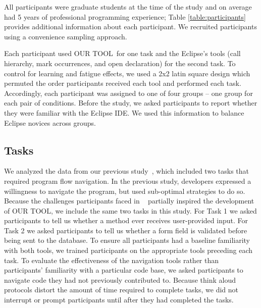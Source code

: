 \documentclass[conference]{IEEEtran}
\newcommand{\toolName}{OUR TOOL}
\begin{document}
All participants were graduate students at the time of the study and on average had 5 years of professional programming experience; Table \ref{table:participants} provides additional information about each participant. We recruited participants using a convenience sampling approach. 

Each participant used \toolName~for one task and the Eclipse's tools (call hierarchy, mark occurrences, and open declaration) for the second task.
To control for learning and fatigue effects, we used a 2x2 latin square design which permuted the order participants received each tool and performed each task. Accordingly, each participant was assigned to one of four groups -- one group for each pair of conditions.
Before the study, we asked participants to report whether they were familiar with the Eclipse IDE. We used this information to balance Eclipse novices across groups.


\subsection{Tasks}
We analyzed the data from our previous study~\cite{Smith2015}, which included two tasks that required program flow navigation.
In the previous study, developers expressed a willingness to navigate the program, but used sub-optimal strategies to do so.
Because the challenges participants faced in ~\cite{Smith2015} partially inspired the development of \toolName, we include the same two tasks in this study.
For Task 1 we asked participants to tell us whether a method ever receives user-provided input.
For Task 2 we asked participants to tell us whether a form field is validated before being sent to the database.
To ensure all participants had a baseline familiarity with both tools, we trained participants on the appropriate tools preceding each task. 
To evaluate the effectiveness of the navigation tools rather than participants' familiarity with a particular code base, we asked participants to navigate code they had not previously contributed to. 
Because think aloud protocols distort the amount of time required to complete tasks, we did not interrupt or prompt participants until after they had completed the tasks.

\end{document}
